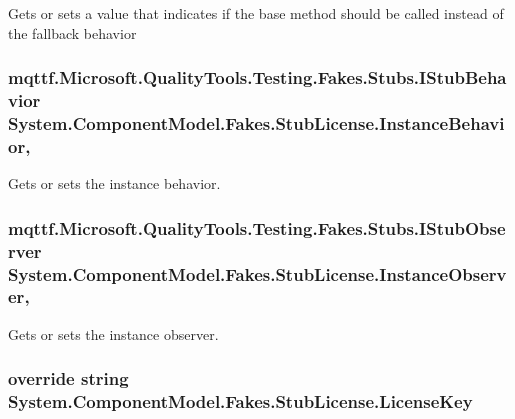 Gets or sets a value that indicates if the base method should be called instead of the fallback behavior

\hypertarget{class_system_1_1_component_model_1_1_fakes_1_1_stub_license_a53f28732537c9136c03fde3f73c8b000}{
\subsubsection[{Instance\-Behavior}]{\setlength{\rightskip}{0pt plus 5cm}mqttf.\-Microsoft.\-Quality\-Tools.\-Testing.\-Fakes.\-Stubs.\-I\-Stub\-Behavior System.\-Component\-Model.\-Fakes.\-Stub\-License.\-Instance\-Behavior\hspace{0.3cm}{\ttfamily [get]}, {\ttfamily [set]}}}\label{class_system_1_1_component_model_1_1_fakes_1_1_stub_license_a53f28732537c9136c03fde3f73c8b000}


Gets or sets the instance behavior.

\hypertarget{class_system_1_1_component_model_1_1_fakes_1_1_stub_license_ab95a2cef3bd0f0217a9c3cc495e25906}{
\subsubsection[{Instance\-Observer}]{\setlength{\rightskip}{0pt plus 5cm}mqttf.\-Microsoft.\-Quality\-Tools.\-Testing.\-Fakes.\-Stubs.\-I\-Stub\-Observer System.\-Component\-Model.\-Fakes.\-Stub\-License.\-Instance\-Observer\hspace{0.3cm}{\ttfamily [get]}, {\ttfamily [set]}}}\label{class_system_1_1_component_model_1_1_fakes_1_1_stub_license_ab95a2cef3bd0f0217a9c3cc495e25906}


Gets or sets the instance observer.

\hypertarget{class_system_1_1_component_model_1_1_fakes_1_1_stub_license_a97d94ec65759d2112cc74a82d5c828e2}{
\subsubsection[{License\-Key}]{\setlength{\rightskip}{0pt plus 5cm}override string System.\-Component\-Model.\-Fakes.\-Stub\-License.\-License\-Key\hspace{0.3cm}{\ttfamily [get]}}}\label{class_system_1_1_component_model_1_1_fakes_1_1_stub_license_a97d94ec65759d2112cc74a82d5c828e2}


